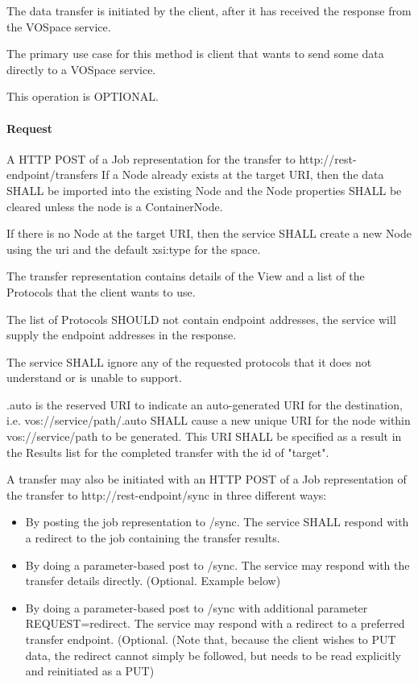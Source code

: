 \documentclass[11pt,a4paper]{ivoa}
\begin{document}
The data transfer is initiated by the client, after it has received the response from the VOSpace service.

The primary use case for this method is client that wants to send some data directly to a VOSpace service.

This operation is OPTIONAL.

\paragraph{Request}
A HTTP POST of a Job representation for the transfer to http://rest-endpoint/transfers
If a Node already exists at the target URI, then the data SHALL be imported into the existing Node and the Node properties SHALL be cleared unless the node is a ContainerNode.

If there is no Node at the target URI, then the service SHALL create a new Node using the uri and the default xsi:type for the space.

The transfer representation contains details of the View and a list of the Protocols that the client wants to use.

The list of Protocols SHOULD not contain endpoint addresses, the service will supply the endpoint addresses in the response.

The service SHALL ignore any of the requested protocols that it does not understand or is unable to support.

.auto is the reserved URI to indicate an auto-generated URI for the destination, i.e. vos://service/path/.auto SHALL cause a new unique URI for the node within vos://service/path to be generated.  This URI SHALL be specified as a result in the Results list for the completed transfer with the id of "target".

A transfer may also be initiated with an HTTP POST of a Job representation of the transfer to http://rest-endpoint/sync in three different ways:
\begin{itemize}
    \item By posting the job representation to /sync. The service SHALL respond with a redirect to the job containing the transfer results.
    \item By doing a parameter-based post to /sync. The service may respond with the transfer details directly. (Optional. Example below)
    \item By doing a parameter-based post to /sync with additional parameter REQUEST=redirect. The service may respond with a redirect to a preferred transfer endpoint. (Optional. (Note that, because the client wishes to PUT data, the redirect cannot simply be followed, but needs to be read explicitly and reinitiated as a PUT)
\end{itemize}
\end{document}
